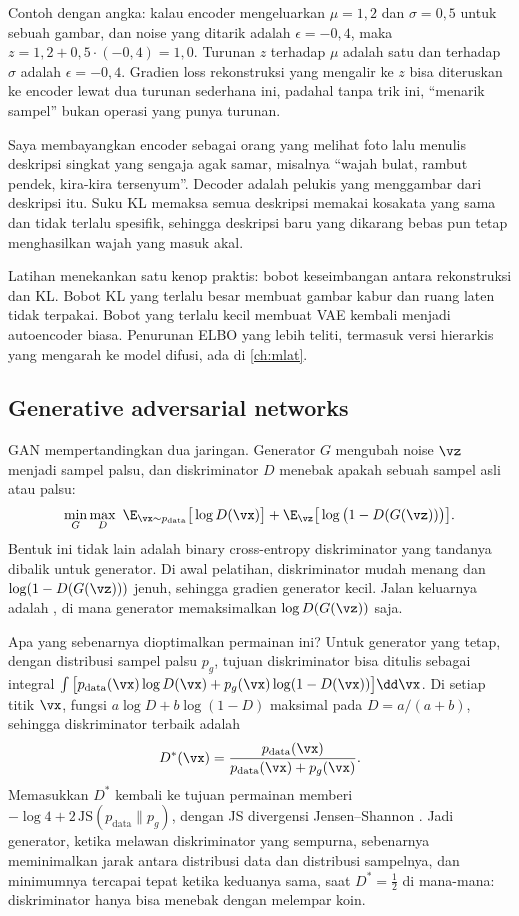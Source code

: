 Contoh dengan angka: kalau encoder mengeluarkan $\mu=1{,}2$ dan $\sigma=0{,}5$ untuk sebuah gambar, dan noise yang ditarik
adalah $\epsilon=-0{,}4$, maka $z=1{,}2+0{,}5\cdot(-0{,}4)=1{,}0$. Turunan $z$ terhadap $\mu$ adalah satu dan terhadap $\sigma$
adalah $\epsilon=-0{,}4$. Gradien loss rekonstruksi yang mengalir ke $z$ bisa diteruskan ke encoder lewat dua turunan
sederhana ini, padahal tanpa trik ini, ``menarik sampel'' bukan operasi yang punya turunan.

Saya membayangkan encoder sebagai orang yang melihat foto lalu menulis deskripsi singkat yang
sengaja agak samar, misalnya ``wajah bulat, rambut pendek, kira-kira tersenyum''. Decoder adalah
pelukis yang menggambar dari deskripsi itu. Suku KL memaksa semua deskripsi memakai kosakata yang
sama dan tidak terlalu spesifik, sehingga deskripsi baru yang dikarang bebas pun tetap
menghasilkan wajah yang masuk akal.

Latihan menekankan satu kenop praktis: bobot keseimbangan antara rekonstruksi dan KL. Bobot KL yang
terlalu besar membuat gambar kabur dan ruang laten tidak terpakai. Bobot yang terlalu kecil
membuat VAE kembali menjadi autoencoder biasa. Penurunan ELBO yang lebih teliti, termasuk versi
hierarkis yang mengarah ke model difusi, ada di \cref{ch:mlat}.

\subsection{Generative adversarial networks}

GAN \citep{goodfellow2014} mempertandingkan dua jaringan. Generator $G$ mengubah noise $\vz$ menjadi
sampel palsu, dan diskriminator $D$ menebak apakah sebuah sampel asli atau palsu:
\begin{equation}
\min_G\max_D\ \E_{\vx\sim p_{\mathrm{data}}}\big[\log D(\vx)\big]+\E_{\vz}\big[\log\big(1-D(G(\vz))\big)\big].
\end{equation}
Bentuk ini tidak lain adalah binary cross-entropy diskriminator yang tandanya dibalik untuk
generator. Di awal pelatihan, diskriminator mudah menang dan $\log(1-D(G(\vz)))$ jenuh, sehingga
gradien generator kecil. Jalan keluarnya adalah , di mana generator
memaksimalkan $\log D(G(\vz))$ saja.

Apa yang sebenarnya dioptimalkan permainan ini? Untuk generator yang tetap, dengan distribusi sampel
palsu $p_g$, tujuan diskriminator bisa ditulis sebagai integral
$\int\big[p_{\mathrm{data}}(\vx)\log D(\vx)+p_g(\vx)\log(1-D(\vx))\big]\dd\vx$. Di setiap titik $\vx$,
fungsi $a\log D+b\log(1-D)$ maksimal pada $D=a/(a+b)$, sehingga diskriminator terbaik adalah
\begin{equation}
D^*(\vx)=\frac{p_{\mathrm{data}}(\vx)}{p_{\mathrm{data}}(\vx)+p_g(\vx)}.
\end{equation}
Memasukkan $D^*$ kembali ke tujuan permainan memberi $-\log4+2\,\mathrm{JS}(p_{\mathrm{data}}\|p_g)$, dengan
JS divergensi Jensen--Shannon \citep{goodfellow2014}. Jadi generator, ketika melawan diskriminator yang
sempurna, sebenarnya meminimalkan jarak antara distribusi data dan distribusi sampelnya, dan
minimumnya tercapai tepat ketika keduanya sama, saat $D^*=\tfrac12$ di mana-mana: diskriminator hanya bisa
menebak dengan melempar koin.

